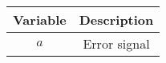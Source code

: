     \begin{tabular}{|c|c|} 
    \hline
\textbf{Variable}& \textbf{Description}\\\hline
    $a$& Error signal\\\hline
    \end{tabular}
